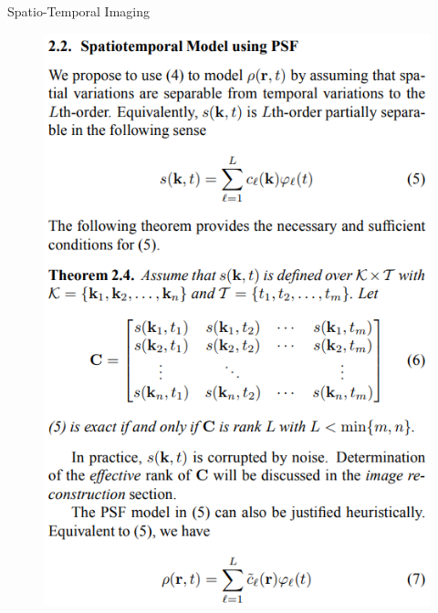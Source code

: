 \documentclass[aspectratio=169]{beamer}
\begin{document}
	\begin{frame}{Spatio-Temporal Imaging}
		\begin{figure}
			\centering
			\includegraphics[height=0.85\textheight]{figures/psf2.png}
		\end{figure}
	\end{frame}
	
\end{document}
